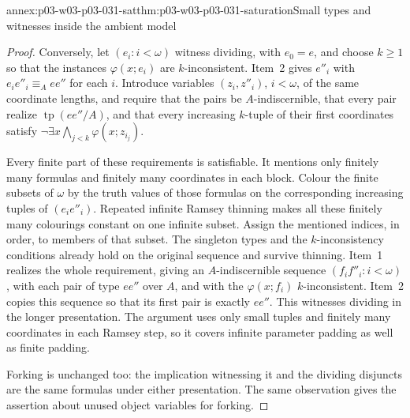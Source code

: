 \begin{annexitem}{annex:p03-w03-p03-031-sat}{thm:p03-w03-p03-031-saturation}{Small types and witnesses inside the ambient model}
\begin{proof}
Conversely, let \((e_i:i<\omega)\) witness dividing, with \(e_0=e\),
and choose \(k\geq1\) so that the instances \(\varphi(x;e_i)\) are
\(k\)-inconsistent.  Item~2 gives \(e''_i\) with
\(e_ie''_i\equiv_Aee''\) for each \(i\).  Introduce variables
\((z_i,z''_i)\), \(i<\omega\), of the same coordinate lengths, and require
that the pairs be \(A\)-indiscernible, that every pair realize
\(\operatorname{tp}(ee''/A)\), and that every increasing \(k\)-tuple
of their first coordinates satisfy
\(\neg\exists x\bigwedge_{j<k}\varphi(x;z_{i_j})\).

Every finite part of these requirements is satisfiable.  It mentions only
finitely many formulas and finitely many coordinates in each block.
Colour the finite subsets of \(\omega\) by the truth values of those
formulas on the corresponding increasing tuples of \((e_ie''_i)\).
Repeated infinite Ramsey thinning makes all these finitely many
colourings constant on one infinite subset.  Assign the mentioned
indices, in order, to members of that subset.  The singleton types and
the \(k\)-inconsistency conditions already hold on the original sequence
and survive thinning.  Item~1 realizes the whole requirement, giving an
\(A\)-indiscernible sequence \((f_if''_i:i<\omega)\), with each pair of
type \(ee''\) over \(A\), and with the \(\varphi(x;f_i)\)
\(k\)-inconsistent.  Item~2 copies this sequence so that its first pair is
exactly \(ee''\).  This witnesses dividing in the longer presentation.
The argument uses only small tuples and finitely many coordinates in each
Ramsey step, so it covers infinite parameter padding as well as finite
padding.

Forking is unchanged too: the implication witnessing it and the dividing
disjuncts are the same formulas under either presentation.  The same
observation gives the assertion about unused object variables for forking.

\end{proof}
\end{annexitem}

